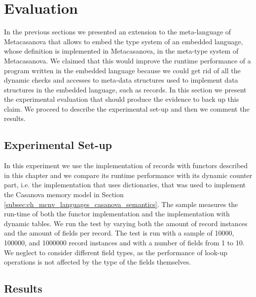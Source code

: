 \section{Evaluation}
\label{sec:ch_functors_evaluation}
In the previous sections we presented an extension to the meta-language of Metacasanova that allows to embed the type system of an embedded language, whose definition is implemented in Metacasanova, in the meta-type system of Metacasanova. We claimed that this would improve the runtime performance of a program written in the embedded language because we could get rid of all the dynamic checks and accesses to meta-data structures used to implement data structures in the embedded language, such as records. In this section we present the experimental evaluation that should produce the evidence to back up this claim. We proceed to describe the experimental set-up and then we comment the results.

\subsection{Experimental Set-up}
In this experiment we use the implementation of records with functors described in this chapter and we compare its runtime performance with its dynamic counter part, i.e. the implementation that uses dictionaries, that was used to implement the Casanova memory model in Section \ref{subsec:ch_mcnv_languages_casanova_semantics}. The sample measures the run-time of both the functor implementation and the implementation with dynamic tables. We run the test by varying both the amount of record instances and the amount of fields per record. The test is run with a sample of 10000, 100000, and 1000000 record instances and with a number of fields from 1 to 10. We neglect to consider different field types, as the performance of look-up operations is not affected by the type of the fields themselves.

\subsection{Results}

